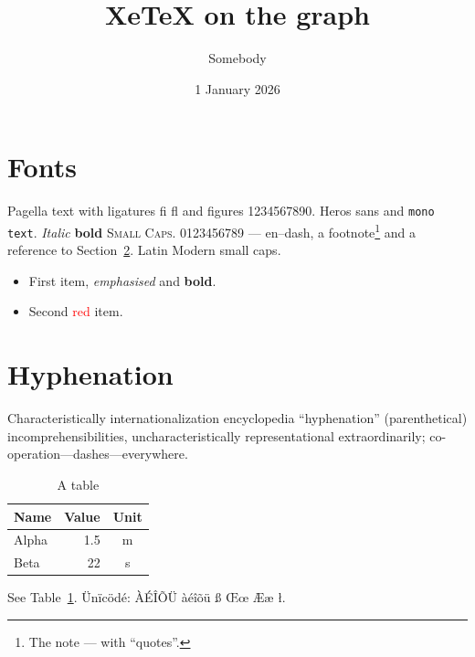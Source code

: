\documentclass[11pt]{article}
\title{XeTeX on the graph}\author{Somebody}\date{1 January 2026}
\begin{document}
\maketitle
\section{Fonts}\label{sec:a}
Pagella text with ligatures fi fl and figures 1234567890. \textsf{Heros sans}
and \texttt{mono text}. \textit{Italic} \textbf{bold} \textsc{Small Caps}.
{0123456789} --- en–dash, a footnote\footnote{The
note — with “quotes”.} and a reference to Section~\ref{sec:b}. {\lmsc Latin Modern small caps.}
\begin{itemize}
\item First item, \emph{emphasised} and \textbf{bold}.
\item Second \textcolor{red}{red} item.
\end{itemize}
\section{Hyphenation}\label{sec:b}
\parbox{4cm}{\termes Characteristically internationalization encyclopedia
``hyphenation'' (parenthetical) incomprehensibilities, uncharacteristically
representational extraordinarily; co-operation—dashes—everywhere.}
\begin{table}[h]\centering
\begin{tabular}{lrc}\toprule Name & Value & Unit\\\midrule Alpha & 1.5 & m\\ Beta & 22 & s\\\bottomrule\end{tabular}
\caption{A table}\label{tab:x}
\end{table}
See Table~\ref{tab:x}. Ünïcödé: ÀÉÎÕÜ àéîõü ß Œœ Ææ ł.
\end{document}
